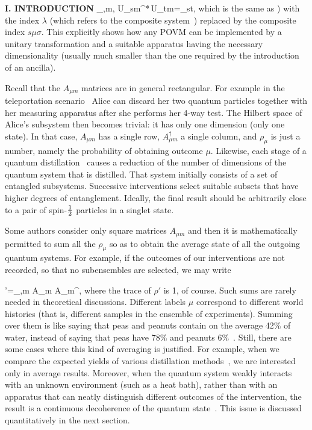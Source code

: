 \begin{center}{\bf I. INTRODUCTION}
\beq \sum_{\mu,m,\sigma}
  U_{s\mu\sigma m}^*\,U_{t\mu\sigma m}=\delta_{st},\eeq
which is the same as ) with the index $\lambda$ (which refers
to the composite system~\cC) replaced by the composite index
$s\mu\sigma$. This explicitly shows how any POVM can be implemented by a
unitary transformation and a suitable apparatus having the necessary
dimensionality (usually much smaller than the one required by the
introduction of an ancilla).

Recall that the $A_{\mu m}$ matrices are in general rectangular. For
example in the teleportation scenario~\cite{telep} Alice can discard her
two quantum particles together with her measuring apparatus after she
performs her 4-way test. The Hilbert space of Alice's subsystem then
becomes trivial: it has only one dimension (only one state). In that
case, $A_{\mu m}$ has a single row, $A_{\mu m}^\dagger$ a single column,
and $\rho_\mu$ is just a number, namely the probability of obtaining
outcome $\mu$. Likewise, each stage of a quantum
distillation~\cite{distil1,distil2} causes a reduction of the number of
dimensions of the quantum system that is distilled. That system
initially consists of a set of entangled subsystems. Successive
interventions select suitable subsets that have higher degrees of
entanglement. Ideally, the final result should be arbitrarily close to a
pair of spin-$1\over2$ particles in a singlet state.

Some authors consider only square matrices $A_{\mu m}$ and then it is
mathematically permitted to sum all the $\rho_\mu$ so as to obtain the
average state of all the outgoing quantum systems. For example, if the
outcomes of our interventions are not recorded, so that no subensembles
are selected, we may write

\beq  \rho'=\sum_{\mu,m} A_{\mu m}\,\rho\,A_{\mu m}^\dagger,
  \label{noselect} \eeq
where the trace of $\rho'$ is 1, of course. Such sums are rarely needed
in theoretical discussions. Different labels $\mu$ correspond to
different world histories (that is, different samples in the ensemble of
experiments). Summing over them is like saying that peas and peanuts
contain on the average 42\% of water, instead of saying that peas have
78\% and peanuts 6\%~\cite{USDA}. Still, there are some cases where this
kind of averaging is justified. For example, when we compare the
expected yields of various distillation methods~\cite{distil1,distil2},
we are interested only in average results. Moreover, when the quantum
system weakly interacts with an unknown environment (such as a heat
bath), rather than with an apparatus that can neatly distinguish
different outcomes of the intervention, the result is a continuous
decoherence of the quantum state~\cite{Zurek}. This issue is discussed
quantitatively in the next section.


\end{center}

